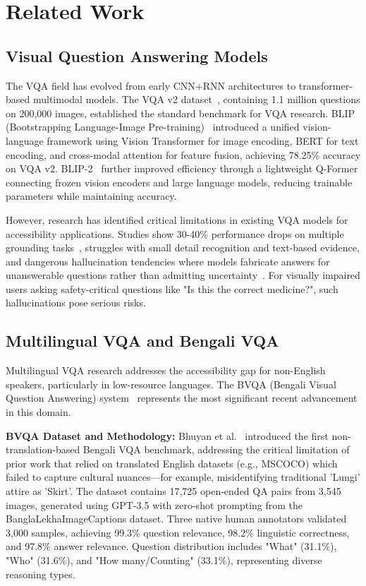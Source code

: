 \documentclass[conference]{IEEEtran}
\begin{document}
\section{Related Work}

\subsection{Visual Question Answering Models}

The VQA field has evolved from early CNN+RNN architectures to transformer-based multimodal models. The VQA v2 dataset~\cite{vqa_v2_2017}, containing 1.1 million questions on 200,000 images, established the standard benchmark for VQA research. BLIP (Bootstrapping Language-Image Pre-training)~\cite{blip_2022} introduced a unified vision-language framework using Vision Transformer for image encoding, BERT for text encoding, and cross-modal attention for feature fusion, achieving 78.25\% accuracy on VQA v2. BLIP-2~\cite{blip2_2023} further improved efficiency through a lightweight Q-Former connecting frozen vision encoders and large language models, reducing trainable parameters while maintaining accuracy.

However, research has identified critical limitations in existing VQA models for accessibility applications. Studies show 30-40\% performance drops on multiple grounding tasks~\cite{vqa_limitations_2024}, struggles with small detail recognition and text-based evidence, and dangerous hallucination tendencies where models fabricate answers for unanswerable questions rather than admitting uncertainty~\cite{vizwiz_lf_2024}. For visually impaired users asking safety-critical questions like "Is this the correct medicine?", such hallucinations pose serious risks.

\subsection{Multilingual VQA and Bengali VQA}

Multilingual VQA research addresses the accessibility gap for non-English speakers, particularly in low-resource languages. The BVQA (Bengali Visual Question Answering) system~\cite{bvqa_2025} represents the most significant recent advancement in this domain.

\textbf{BVQA Dataset and Methodology:} Bhuyan et al.~\cite{bvqa_2025} introduced the first non-translation-based Bengali VQA benchmark, addressing the critical limitation of prior work that relied on translated English datasets (e.g., MSCOCO) which failed to capture cultural nuances—for example, misidentifying traditional 'Lungi' attire as 'Skirt'. The dataset contains 17,725 open-ended QA pairs from 3,545 images, generated using GPT-3.5 with zero-shot prompting from the BanglaLekhaImageCaptions dataset. Three native human annotators validated 3,000 samples, achieving 99.3\% question relevance, 98.2\% linguistic correctness, and 97.8\% answer relevance. Question distribution includes "What" (31.1\%), "Who" (31.6\%), and "How many/Counting" (33.1\%), representing diverse reasoning types.
\end{document}
